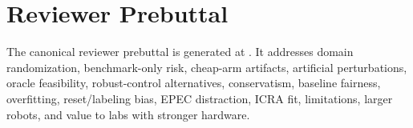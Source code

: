 \section{Reviewer Prebuttal}
The canonical reviewer prebuttal is generated at . It addresses domain randomization, benchmark-only risk, cheap-arm artifacts, artificial perturbations, oracle feasibility, robust-control alternatives, conservatism, baseline fairness, overfitting, reset/labeling bias, EPEC distraction, ICRA fit, limitations, larger robots, and value to labs with stronger hardware.
